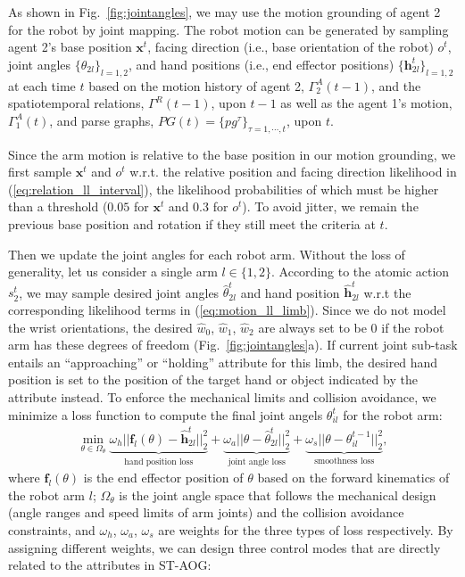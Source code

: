 \documentclass[letterpaper, 10 pt, conference]{ieeeconf}  %
\def \hb{\bm{h}} %
\def \xb{\bm{x}} %
\def \fb{\bm{f}} %
\begin{document}
As shown in Fig.~\ref{fig:jointangles}, we may use the motion grounding of agent 2 for the robot by joint mapping. The robot motion can be generated by sampling agent 2's base position $\xb^t$, facing direction (i.e., base orientation of the robot) $o^t$, joint angles $\{\theta_{2l}\}_{l=1,2}$, and hand positions (i.e., end effector positions) $\{\hb_{2l}^t\}_{l=1,2}$ at each time $t$ based on the motion history of agent 2, $\Gamma_2^A(t-1)$, and the spatiotemporal relations, $\Gamma^R(t-1)$, upon $t-1$ as well as the agent 1's motion, $\Gamma_1^A(t)$, and parse graphs, $PG(t) = \{pg^\tau\}_{\tau = 1,\cdots,t}$, upon $t$.

Since the arm motion is relative to the base position in our motion grounding, we first sample $\xb^t$ and $o^t$ w.r.t. the relative position and facing direction likelihood in (\ref{eq:relation_ll_interval}), the likelihood probabilities of which must be higher than a threshold ($0.05$ for $\xb^t$ and $0.3$ for $o^t$). To avoid jitter, we remain the previous base position and rotation if they still meet the criteria at $t$.

Then we update the joint angles for each robot arm. Without the loss of generality, let us consider a single arm $l\in\{1,2\}$. According to the atomic action $s_2^t$, we may sample desired joint angles $\hat{\theta}_{2l}^t$ and hand position $\hat{\hb}_{2l}^t$ w.r.t the corresponding likelihood terms in (\ref{eq:motion_ll_limb}). Since we do not model the wrist orientations, the desired $\hat{w}_0$, $\hat{w}_1$, $\hat{w}_2$ are always set to be 0 if the robot arm has these degrees of freedom (Fig.~\ref{fig:jointangles}a). If current joint sub-task entails an ``approaching'' or ``holding'' attribute for this limb, the desired hand position is set to the position of the target hand or object indicated by the attribute instead. To enforce the mechanical limits and collision avoidance, we minimize a loss function to compute the final joint angels $\theta_{il}^t$ for the robot arm:
\begin{equation}
\begin{array}{c}
\displaystyle \min_{\theta \in \Omega_{\theta}} \underbrace{\omega_h ||\fb_l(\theta)-\hat{\hb}_{2l}^t||_2^2}_{\text{hand position loss}} + \underbrace{\omega_a ||\theta - \hat{\theta}_{2l}^t||_2^2}_{\text{joint angle loss}} + \underbrace{\omega_s ||\theta - \theta_{il}^{t-1}||_2^2}_{\text{smoothness loss}},
\end{array}
\label{eq:loss}
\end{equation}
where $\fb_l(\theta)$ is the end effector position of $\theta$ based on the forward kinematics of the robot arm $l$; $\Omega_{\theta}$ is the joint angle space that follows the mechanical design (angle ranges and speed limits of arm joints) and the collision avoidance constraints, and $\omega_h$, $\omega_a$, $\omega_s$ are weights for the three types of loss respectively. By assigning different weights, we can design three control modes that are directly related to the attributes in ST-AOG:
\end{document}
